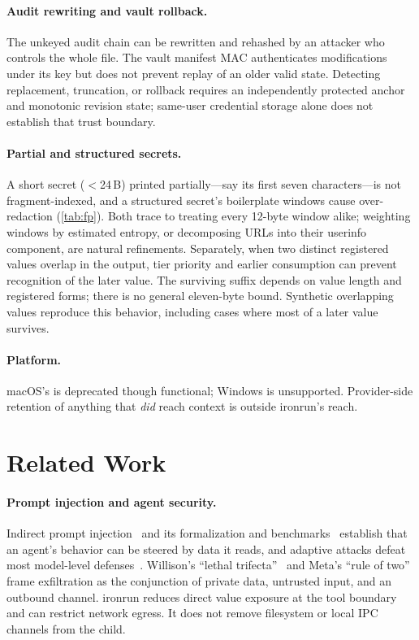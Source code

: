 \documentclass[10pt,twocolumn]{article}
\newcommand{\sys}{\textsf{ironrun}}
\newcommand{\code}[1]{\textup{\texttt{\detokenize{#1}}}}
\begin{document}
\paragraph{Audit rewriting and vault rollback.} The unkeyed audit chain can be
rewritten and rehashed by an attacker who controls the whole file. The vault
manifest MAC authenticates modifications under its key but does not prevent
replay of an older valid state. Detecting replacement, truncation, or rollback
requires an independently protected anchor and monotonic revision state;
same-user credential storage alone does not establish that trust boundary.

\paragraph{Partial and structured secrets.} A short secret ($<$24\,B) printed
partially---say its first seven characters---is not fragment-indexed, and a
structured secret's boilerplate windows cause over-redaction (\cref{tab:fp}).
Both trace to treating every 12-byte window alike; weighting windows by
estimated entropy, or decomposing URLs into their userinfo component, are
natural refinements. Separately, when two distinct registered values overlap in
the output, tier priority and earlier consumption can prevent recognition of
the later value. The surviving suffix depends on value length and registered
forms; there is no general eleven-byte bound. Synthetic overlapping values
reproduce this behavior, including cases where most of a later value survives.

\paragraph{Platform.} macOS's \code{sandbox-exec} is deprecated though
functional; Windows is unsupported. Provider-side retention of anything that
\emph{did} reach context is outside \sys{}'s reach.

\section{Related Work}
\label{sec:related}

\paragraph{Prompt injection and agent security.} Indirect prompt
injection~\citep{greshake2023youve,perez2022ignore} and its formalization and
benchmarks~\citep{liu2024formalizing,debenedetti2024agentdojo,zhan2024injecagent}
establish that an agent's behavior can be steered by data it reads, and adaptive
attacks defeat most model-level defenses~\citep{nasr2025attacker}. Willison's
``lethal trifecta''~\citep{willison2025trifecta} and Meta's ``rule of
two''~\citep{meta2025ruleoftwo} frame exfiltration as the conjunction of private
data, untrusted input, and an outbound channel. \sys{} reduces direct value
exposure at the tool boundary and can restrict network egress. It does not
remove filesystem or local IPC channels from the child.
\end{document}
